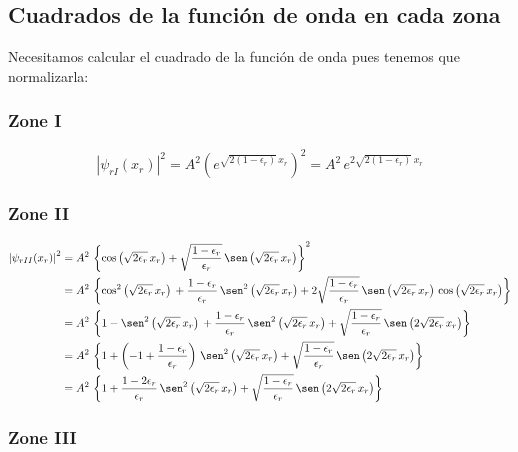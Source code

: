 \subsection{Cuadrados de la función de onda en cada zona}
Necesitamos calcular el cuadrado de la función de onda pues tenemos
que normalizarla:

\subsubsection{Zone I}
\[
\left|\psi_{rI}(x_r)\right|^2
= A^2\left(e^{\sqrt{2(1-\epsilon_r)}\,x_r}\right)^2
= A^2\,e^{2\sqrt{2(1-\epsilon_r)}\,x_r}
\]

\subsubsection{Zone II}
\begin{align*}
\left|\psi_{rII}(x_r)\right|^2
&= A^2\,\left\lbrace\cos\left(\sqrt{2\epsilon_r}\,x_r\right)
  + \sqrt{\frac{1-\epsilon_r}{\epsilon_r}}\,
    \sen\left(\sqrt{2\epsilon_r}\,x_r\right)
\right\rbrace^2\\
&= A^2\,\left\lbrace
 \cos^2\left(\sqrt{2\epsilon_r}\,x_r\right)\,
 + \frac{1-\epsilon_r}{\epsilon_r}\,\sen^2\left(\sqrt{2\epsilon_r}\,x_r\right)
 + 2\sqrt{\frac{1-\epsilon_r}{\epsilon_r}}\,
 \sen\left(\sqrt{2\epsilon_r}\,x_r\right)\,
 \cos\left(\sqrt{2\epsilon_r}\,x_r\right)
\right\rbrace\\
&= A^2\,\left\lbrace
 1 - \sen^2\left(\sqrt{2\epsilon_r}\,x_r\right)\,
 + \frac{1-\epsilon_r}{\epsilon_r}\,\sen^2\left(\sqrt{2\epsilon_r}\,x_r\right)
 + \sqrt{\frac{1-\epsilon_r}{\epsilon_r}}\,
 \sen\left(2\sqrt{2\epsilon_r}\,x_r\right)
\right\rbrace\\
&= A^2\,\left\lbrace
 1  
 + \left(-1+\frac{1-\epsilon_r}{\epsilon_r}\right)\,\sen^2\left(\sqrt{2\epsilon_r}\,x_r\right)
 + \sqrt{\frac{1-\epsilon_r}{\epsilon_r}}\,
 \sen\left(2\sqrt{2\epsilon_r}\,x_r\right)
\right\rbrace\\
&= A^2\,\left\lbrace
 1  
 + \frac{1-2\epsilon_r}{\epsilon_r}\,\sen^2\left(\sqrt{2\epsilon_r}\,x_r\right)
 + \sqrt{\frac{1-\epsilon_r}{\epsilon_r}}\,
 \sen\left(2\sqrt{2\epsilon_r}\,x_r\right)
\right\rbrace
\end{align*}

\subsubsection{Zone III}

